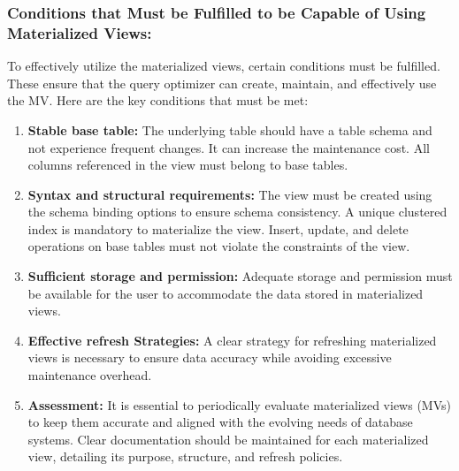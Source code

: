 \subsubsection{Conditions that Must be Fulfilled to be Capable of Using Materialized Views:}
To effectively utilize the materialized views, certain conditions must be fulfilled. These ensure that the query optimizer can create, maintain, and effectively use the MV. Here are the key conditions that must be met:

\begin{enumerate}[label=\alph*)]
    \item \textbf{Stable base table:} The underlying table should have a table schema and not experience frequent changes. It can increase the maintenance cost. All columns referenced in the view must belong to base tables.
    
    \item \textbf{Syntax and structural requirements:} The view must be created using the schema binding options to ensure schema consistency. A unique clustered index is mandatory to materialize the view. Insert, update, and delete operations on base tables must not violate the constraints of the view.
    
    \item \textbf{Sufficient storage and permission:} Adequate storage and permission must be available for the user to accommodate the data stored in materialized views.
    \item \textbf{Effective refresh Strategies:} A clear strategy for refreshing materialized views is necessary to ensure data accuracy while avoiding excessive maintenance overhead.
    \item \textbf{Assessment:} It is essential to periodically evaluate materialized views (MVs) to keep them accurate and aligned with the evolving needs of database systems. Clear documentation should be maintained for each materialized view, detailing its purpose, structure, and refresh policies.
\end{enumerate}




